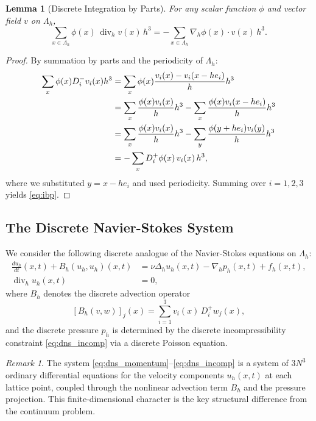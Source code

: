 \documentclass[12pt, a4paper]{article}
\theoremstyle{plain}
\newtheorem{lemma}[theorem]{Lemma}
\theoremstyle{definition}
\theoremstyle{remark}
\newtheorem{remark}[theorem]{Remark}
\newcommand{\grad}{\nabla_h}
\newcommand{\lapl}{\Delta_h}
\newcommand{\divh}{\operatorname{div}_h}
\newcommand{\uh}{u_h}
\newcommand{\ph}{p_h}
\begin{document}
\begin{lemma}[Discrete Integration by Parts]\label{lem:ibp}
  For any scalar function $\phi$ and vector field $v$ on $\Lambda_h$,
  \begin{equation}\label{eq:ibp}
    \sum_{x \in \Lambda_h} \phi(x) \, \divh v(x) \, h^3
    = -\sum_{x \in \Lambda_h} \grad \phi(x) \cdot v(x) \, h^3.
  \end{equation}
\end{lemma}

\begin{proof}
  By summation by parts and the periodicity of $\Lambda_h$:
  \begin{align}
    \sum_{x} \phi(x) D_i^- v_i(x) h^3
    &= \sum_{x} \phi(x) \frac{v_i(x) - v_i(x - he_i)}{h} h^3 \notag \\
    &= \sum_{x} \frac{\phi(x) v_i(x)}{h} h^3 - \sum_{x} \frac{\phi(x) v_i(x-he_i)}{h} h^3 \notag \\
    &= \sum_{x} \frac{\phi(x) v_i(x)}{h} h^3 - \sum_{y} \frac{\phi(y+he_i) v_i(y)}{h} h^3 \notag \\
    &= -\sum_{x} D_i^+ \phi(x) \, v_i(x) \, h^3,
  \end{align}
  where we substituted $y = x - he_i$ and used periodicity.
  Summing over $i = 1,2,3$ yields \eqref{eq:ibp}.
\end{proof}

\subsection{The Discrete Navier-Stokes System}

We consider the following discrete analogue of the Navier-Stokes equations on $\Lambda_h$:
\begin{align}
  \frac{d\uh}{dt}(x,t) + B_h(\uh, \uh)(x,t) &= \nu \lapl \uh(x,t) - \grad \ph(x,t) + f_h(x,t),
  \label{eq:dns_momentum} \\
  \divh \uh(x,t) &= 0,
  \label{eq:dns_incomp}
\end{align}
where $B_h$ denotes the discrete advection operator
\begin{equation}\label{eq:advection}
  [B_h(v,w)]_j(x) = \sum_{i=1}^{3} v_i(x) \, D_i^+ w_j(x),
\end{equation}
and the discrete pressure $\ph$ is determined by the discrete incompressibility
constraint \eqref{eq:dns_incomp} via a discrete Poisson equation.

\begin{remark}\label{rem:ode}
  The system \eqref{eq:dns_momentum}--\eqref{eq:dns_incomp} is a system of
  $3N^3$ ordinary differential equations for the velocity components
  $\uh(x,t)$ at each lattice point, coupled through the nonlinear advection
  term $B_h$ and the pressure projection. This finite-dimensional character
  is the key structural difference from the continuum problem.
\end{remark}
\end{document}
